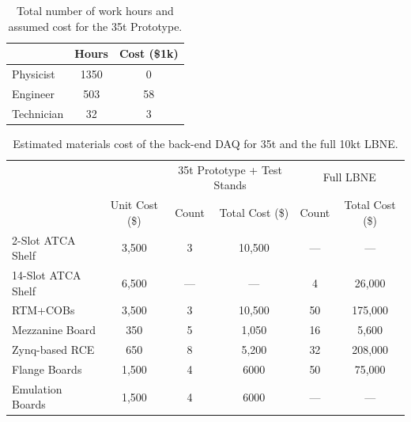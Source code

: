 \begin{table}[tbh]
\begin{center}
\begin{tabular}{|l|c|c|}   
\hline \hline 
    & Hours  & Cost (\$1k) \\      
\hline
   Physicist           & 1350 &0 \\ 
   Engineer           & 503   &58 \\ 
   Technician        & 32    &3\\ 
\hline \hline
\end{tabular}
\caption[]{Total number of work hours and assumed cost for the 35t Prototype.}
\label{tab:labor} 
\end{center}
\end{table}





\begin{table}[tbh]
\begin{center}
\begin{tabular}{|l|c|cc|cc|}   
\hline \hline 
						 			 &         & \multicolumn{2}{|c|}{35t  Prototype + Test Stands} &\multicolumn{2}{|c|}{Full LBNE }    \\      
									 & Unit Cost (\$)& Count &  Total Cost (\$) & Count &  Total Cost  (\$)\\      
\hline
   2-Slot ATCA Shelf    & 3,500              &  3         &    10,500     &  ---  &  ---  \\ 
  14-Slot ATCA Shelf   & 6,500              &  ---         &    ---    &  4  &  26,000  \\ 
     RTM+COBs             & 3,500              &  3         &    10,500     &    50   &   175,000\\ 
   Mezzanine Board     & 350                &  5         &       1,050    &  16   &  5,600 \\ 
   Zynq-based RCE	   & 650                &  8          &   5,200        &   32    &208,000\\ 
   Flange Boards          & 1,500              &  4          &  6000        & 50          & 75,000\\ 
   Emulation Boards     & 1,500              &  4          &  6000        &  ---        &    ---  \\ 
\hline \hline
\end{tabular}
\caption[]{Estimated materials cost of the back-end DAQ for 35t and the full 10kt LBNE.}
\label{tab:mats} 
\end{center}
\end{table}

